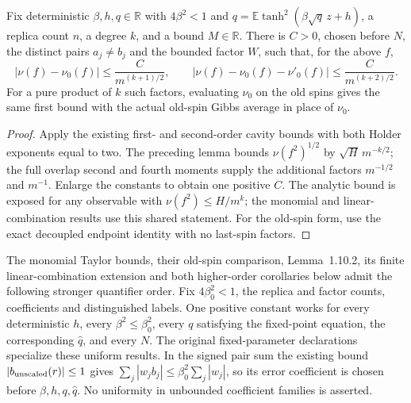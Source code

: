 \begin{theorem}\label{thm:sg-tal:cavity-higher-expansion}
\leanok
{}
Fix deterministic $\beta,h,q\in\mathbb R$ with $4\beta^2<1$ and
$q=\mathbb E\tanh^2(\beta\sqrt q\,z+h)$, a replica count $n$, a degree $k$,
and a bound $M\in\mathbb R$. There is $C>0$, chosen before $N$, the distinct
pairs $a_j\ne b_j$ and the bounded factor $W$, such that, for the above $f$,
\[
 |\nu(f)-\nu_0(f)|\le \frac C{m^{(k+1)/2}},\qquad
 |\nu(f)-\nu_0(f)-\nu'_0(f)|\le \frac C{m^{(k+2)/2}}.
\]
For a pure product of $k$ such factors, evaluating $\nu_0$ on the old spins
gives the same first bound with the actual old-spin Gibbs average in place of $\nu_0$.
\end{theorem}
\begin{proof}
\leanok
Apply the existing first- and second-order cavity bounds with both Holder exponents equal
to two. The preceding lemma bounds $\nu(f^2)^{1/2}$ by $\sqrt H\,m^{-k/2}$;
the full overlap second and fourth moments supply the additional factors
$m^{-1/2}$ and $m^{-1}$. Enlarge the constants to obtain one positive $C$.
The analytic bound is exposed for any observable with $\nu(f^2)\le H/m^k$;
the monomial and linear-combination results use this shared statement.
For the old-spin form, use the exact decoupled endpoint identity with no last-spin factors.
\end{proof}

\begin{remark}
\leanok
{}
The monomial Taylor bounds, their old-spin comparison, Lemma~1.10.2, its finite
linear-combination extension and both higher-order corollaries below admit the following
stronger quantifier order. Fix $4\beta_0^2<1$, the replica and factor counts, coefficients
and distinguished labels. One positive constant works for every deterministic $h$, every
$\beta^2\le\beta_0^2$, every $q$ satisfying the fixed-point equation, the corresponding
$\widehat q$, and every $N$. The original fixed-parameter declarations specialize these
uniform results. In the signed pair sum the existing bound
$|b_{\rm unscaled}(r)|\le1$ gives
$\sum_j|w_j b_j|\le\beta_0^2\sum_j|w_j|$, so its error coefficient is chosen before
$\beta,h,q,\widehat q$. No uniformity in unbounded coefficient families is asserted.
\end{remark}

